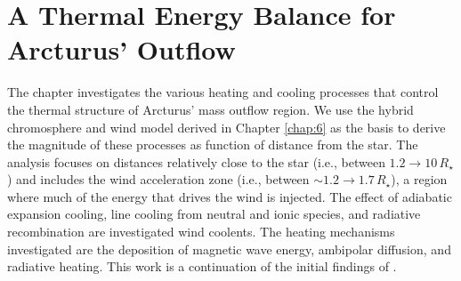 \chapter{A Thermal Energy Balance for Arcturus' Outflow}
\label{chap:7}

The chapter investigates the various heating and cooling processes that control the thermal structure of Arcturus' mass outflow region. We use the hybrid chromosphere and wind model derived in Chapter \ref{chap:6} as the basis to derive the magnitude of these processes as function of distance from the star. The analysis focuses on distances relatively close to the star (i.e., between $1.2\rightarrow 10\,R_{\star}$) and includes the wind acceleration zone (i.e., between $\sim 1.2\rightarrow 1.7\,R_{\star}$), a region where much of the energy that drives the wind is injected. The effect of adiabatic expansion cooling, line cooling from neutral and ionic species, and radiative recombination are investigated wind coolents. The heating mechanisms investigated are the deposition of magnetic wave energy, ambipolar diffusion, and radiative heating. This work is a continuation of the initial findings of \cite{ogorman_2011}.

\pagebreak

